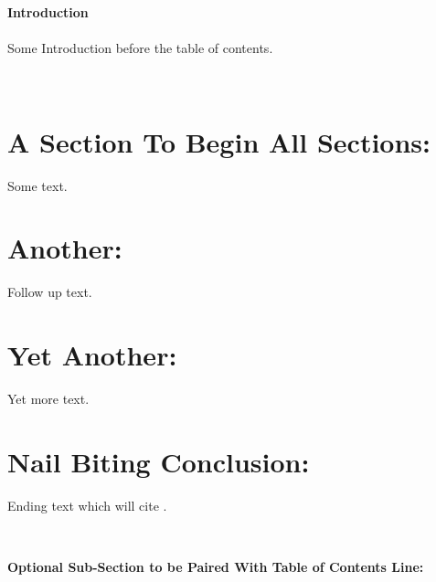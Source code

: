 \documentclass[12pt]{article}
\begin{document}
\begin{flushleft} 
\setlength{\parindent}{1cm} %


\thispagestyle{empty}     
\noindent \textbf{Introduction}\\ 
\hfill \\
Some Introduction before the table of contents. 

\hfill \\

\tableofcontents

\thispagestyle{empty}



\clearpage
\setcounter{page}{1}

\section{A Section To Begin All Sections:}

Some text.

\section{Another:}

Follow up text.

\section{Yet Another:}

Yet more text.

\section{Nail Biting Conclusion:}

Ending text which will cite \citep{cary1967influence}.

\hfill \\

\noindent \textbf{Optional Sub-Section to be Paired With Table of Contents Line:}


\end{flushleft}
\end{document}
